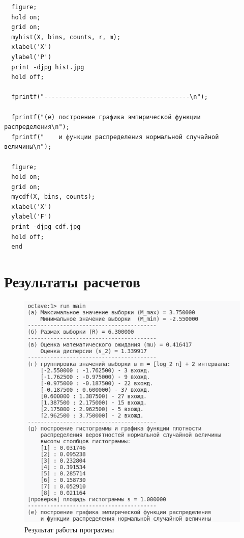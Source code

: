 \begin{lstlisting}
  figure;
  hold on;
  grid on;
  myhist(X, bins, counts, r, m);
  xlabel('X')
  ylabel('P')
  print -djpg hist.jpg
  hold off;
  
  fprintf("----------------------------------------\n");
  
  fprintf("(е) построение графика эмпирической функции распределения\n");
  fprintf("    и функции распределения нормальной случайной величины\n");
  
  figure;
  hold on;
  grid on;
  mycdf(X, bins, counts);
  xlabel('X')
  ylabel('F')
  print -djpg cdf.jpg
  hold off;
  end
\end{lstlisting}

\chapter{Результаты расчетов}

\begin{figure}[H]
	\begin{center}
		\includegraphics[scale=0.75]{assets/launch.png}
		\caption{Результат работы программы}
	\end{center}
\end{figure}


